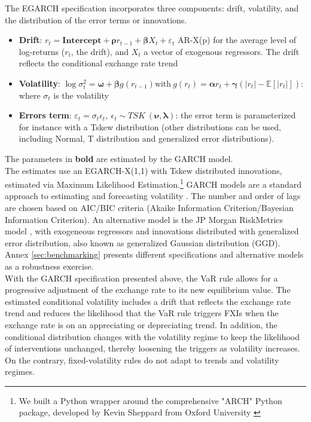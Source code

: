 \documentclass[11pt]{article}
\begin{document}
The EGARCH specification incorporates three components: drift, volatility, and
the distribution of the error terms or innovations.\\

\begin{itemize}
\item \textbf{Drift}: $r_t= \bm{Intercept} + \bm{\rho} r_{t-1} + \bm{\beta}
X_t + \varepsilon_t$ AR-X(p) for the average level of log-returns ($r_t$, the
drift), and  $X_t$ a vector of  exogenous regressors.  The drift  reflects the
conditional exchange rate trend

\item \textbf{Volatility}: $\log \sigma_t^2 = \bm{\omega} + \bm{\beta} g(r_{t-1}) \text{with} \
  g(r_t)= \bm{\alpha} r_t + \bm{\gamma}(|r_t| - \mathbb{E}[|r_t|])$: where $\sigma_t$  is
  the volatility 

\item \textbf{Errors term}: $\varepsilon_t = \sigma_t \epsilon_t,\ \epsilon_t \sim TSK\
(\bm{\nu}, \bm{\lambda})$: the error term is parameterized for instance with
a Tskew  distribution (other  distributions can be  used, including  Normal, T
distribution and generalized error distributions).
  
\end{itemize}

The parameters in \textbf{bold} are estimated by the GARCH model.\\

The  estimates  use  an  EGARCH-X(1,1)  with  Tskew  distributed  innovations,
estimated  via  Maximum  Likelihood  Estimation.\footnote{We  built  a  Python
wrapper around  the comprehensive  "ARCH" Python  package, developed  by Kevin
Sheppard  from Oxford  University  \citep{sheppard2020}} GARCH  models are  a
standard approach to estimating  and forecasting volatility \citep{engle2001}.
The number  and order  of lags  are chosen based  on AIC/BIC  criteria (Akaike
Information Criterion/Bayesian  Information Criterion).  An  alternative model
is  the  JP  Morgan  RiskMetrics model  \citep{zumbach2007},  with  exogeneous
regressors and  innovations distributed  with generalized  error distribution,
also   known    as   generalized    Gaussian   distribution    (GGD).    Annex
\ref{sec:benchmarking}  presents  different   specifications  and  alternative
models as a robustness exercise.\\

With  the GARCH  specification  presented above,  the VaR  rule  allows for  a
progressive adjustment of the exchange rate  to its new equilibrium value. The
estimated conditional volatility  includes a drift that  reflects the exchange
rate trend and reduces the likelihood that the VaR rule triggers FXIs when the
exchange rate  is on an appreciating  or depreciating trend. In  addition, the
conditional  distribution  changes with  the  volatility  regime to  keep  the
likelihood  of  interventions unchanged,  thereby  loosening  the triggers  as
volatility increases.  On the contrary, fixed-volatility rules do not adapt to
trends and volatility regimes.\\
\end{document}

